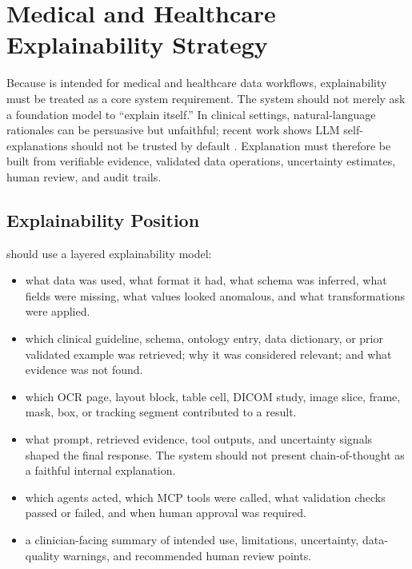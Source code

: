 \section{Medical and Healthcare Explainability Strategy}

Because \projectname{} is intended for medical and healthcare data workflows, explainability must be treated as a core system requirement. The system should not merely ask a foundation model to ``explain itself.'' In clinical settings, natural-language rationales can be persuasive but unfaithful; recent work shows LLM self-explanations should not be trusted by default \cite{huang2024selfExplanations}. Explanation must therefore be built from verifiable evidence, validated data operations, uncertainty estimates, human review, and audit trails.

\subsection{Explainability Position}

\projectname{} should use a layered explainability model:

\begin{itemize}
  \item {} what data was used, what format it had, what schema was inferred, what fields were missing, what values looked anomalous, and what transformations were applied.
  \item {} which clinical guideline, schema, ontology entry, data dictionary, or prior validated example was retrieved; why it was considered relevant; and what evidence was not found.
  \item {} which OCR page, layout block, table cell, DICOM study, image slice, frame, mask, box, or tracking segment contributed to a result.
  \item {} what prompt, retrieved evidence, tool outputs, and uncertainty signals shaped the final response. The system should not present chain-of-thought as a faithful internal explanation.
  \item {} which agents acted, which MCP tools were called, what validation checks passed or failed, and when human approval was required.
  \item {} a clinician-facing summary of intended use, limitations, uncertainty, data-quality warnings, and recommended human review points.
\end{itemize}

